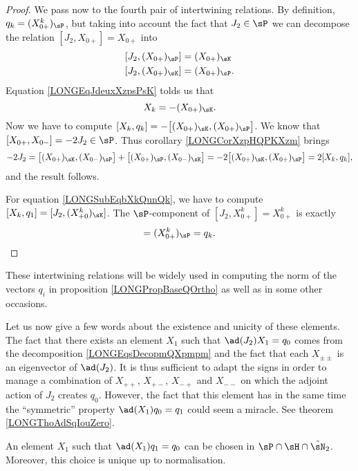 \begin{proof}
	We pass now to the fourth pair of intertwining relations. By definition, $q_k=(X^k_{0+})_{\sP}$, but taking into account the fact that $J_2\in\sP$ we can decompose the relation $[J_2,X_{0+}]=X_{0+}$ into
	\begin{subequations}
		\begin{align}
			[J_2,(X_{0+})_{\sP}]&=(X_{0+})_{\sK}		\label{LONGEqJdeuxXzpsPsK}\\
			[J_2,(X_{0+})_{\sK}]&=(X_{0+})_{\sP}.
		\end{align}
	\end{subequations}
	Equation \eqref{LONGEqJdeuxXzpsPsK} tolds us that 
	\begin{equation}
		X_k=-(X_{0+})_{\sK}.
	\end{equation}
	Now we have to compute $[X_k,q_k]=-\big[ (X_{0+})_{\sK},(X_{0+})_{\sP} \big]$. We know that $[X_{0+},X_{0-}]=-2J_2\in\sP$. Thus corollary \ref{LONGCorXzpHQPKXzm} brings
	\begin{equation}
		-2J_2=\big[ (X_{0+})_{\sK},(X_{0-})_{\sP} \big]+\big[ (X_{0+})_{\sP},(X_{0-})_{\sK} \big]=-2\big[ (X_{0+})_{\sK},(X_{0+})_{\sP} \big]=2[X_k,q_k],
	\end{equation}
	and the result follows.

	For equation \eqref{LONGSubEqbXkQunQk}, we have to compute $[X_k,q_1]=[J_2,(X_{+0}^k)_{\sK}]$. The $\sP$-component of $[J_2,X_{0+}^k]=X_{0+}^k$ is exactly
	\begin{equation}
		[J_2,(X_{0+}^k)_{\sK}]=(X_{0+}^k)_{\sP}=q_k.
	\end{equation}
	
\end{proof}

These intertwining relations will be widely used in computing the norm of the vectors $q_i$ in proposition \ref{LONGPropBaseQOrtho} as well as in some other occasions. 

Let us now give a few words about the existence and unicity of these elements. The fact that there exists an element $X_1$ such that $\ad(J_2)X_1=q_0$ comes from the decomposition \eqref{LONGEqsDecopmQXpmpm} and the fact that each $X_{\pm\pm}$ is an eigenvector of $\ad(J_2)$. It is thus sufficient to adapt the signs in order to manage a combination of $X_{++}$, $X_{+-}$, $X_{-+}$ and $X_{--}$ on which the adjoint action of $J_2$ creates $q_0$. However, the fact that this element has in the same time the ``symmetric'' property $\ad(X_1)q_0=q_1$ could seem a miracle. See theorem \ref{LONGThoAdSqIouZero}.

\begin{lemma}
	An element $X_1$ such that $\ad(X_1)q_1=q_0$ can be chosen in $\sP\cap\sH\cap\tilde\sN_2$. Moreover, this choice is unique up to normalisation.
\end{lemma}

